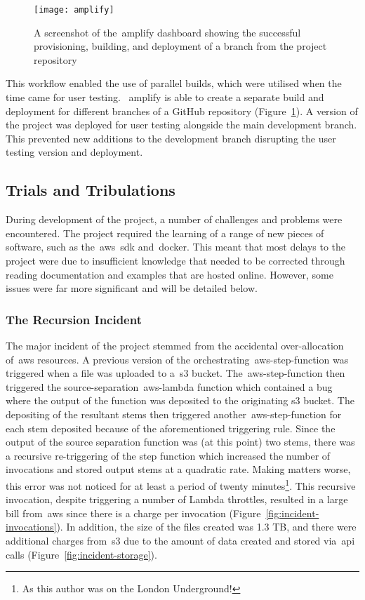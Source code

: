 \begin{figure}[!htb]
    \minipage{\textwidth}
    \texttt{[image: amplify]}
    \caption{A screenshot of the~\gls{amplify} dashboard showing the successful provisioning, building, and deployment of a branch from the project repository}\label{fig:amplify}
    \endminipage
\end{figure}

This workflow enabled the use of parallel builds, which were utilised when the time came for user testing.
~\gls{amplify} is able to create a separate build and deployment for different branches of a GitHub repository
(Figure~\ref{fig:amplify}).
A version of the project was deployed for user testing alongside the main development branch.
This prevented new additions to the development branch disrupting the user testing version and deployment.

\subsection{Trials and Tribulations}\label{subsec:trials-and-tribulations}
During development of the project, a number of challenges and problems were encountered.
The project required the learning of a range of new pieces of software,
such as the~\gls{aws}~\gls{sdk} and~\gls{docker}.
This meant
that most delays to the project were due to insufficient knowledge
that needed to be corrected through reading documentation and examples that are hosted online.
However, some issues were far more significant and will be detailed below.

\subsubsection{The Recursion Incident}\label{subsubsec:recursion-incident}

The major incident of the project stemmed from the accidental over-allocation of~\gls{aws} resources.
A previous version of the orchestrating~\gls{aws-step-function} was triggered
when a file was uploaded to a~\gls{s3} bucket.
The~\gls{aws-step-function} then triggered the source-separation~\gls{aws-lambda} function
which contained a bug where the output of the function was deposited to the originating s3 bucket.
The depositing of the resultant stems then triggered another~\gls{aws-step-function} for each stem
deposited because of the aforementioned triggering rule.
Since the output of the source separation function was (at this point) two stems,
there was a recursive re-triggering of the step function
which increased the number of invocations and stored output stems at a quadratic rate.
Making matters worse,
this error was not noticed for at least a period of twenty minutes\footnote{As this author was on the London Underground!}.
This recursive invocation, despite triggering a number of Lambda throttles,
resulted in a large bill from~\gls{aws} since there is a charge per invocation (Figure~\ref{fig:incident-invocations}).
In addition,
the size of the files created was 1.3 TB,
and there were additional charges from~\gls{s3} due to the amount of data created and stored via~\gls{api} calls
(Figure~\ref{fig:incident-storage}).


